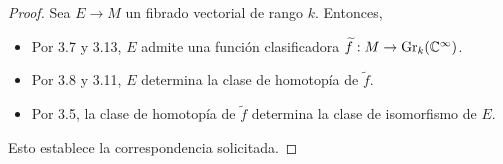 \begin{proof}
Sea $E \to M$ un fibrado vectorial de rango $k$. Entonces,
\begin{itemize}
    \itemsep 0em
    \item Por 3.7 y 3.13, $E$ admite una función clasificadora $\widetilde f : M \to \operatorname{Gr}_k(\mathbb C^\infty)$.
    \item Por 3.8 y 3.11, $E$ determina la clase de homotopía de $\widetilde f$.
    \item Por 3.5, la clase de homotopía de $\widetilde f$ determina la clase de isomorfismo de $E$.
\end{itemize}
Esto establece la correspondencia solicitada.
\end{proof}
